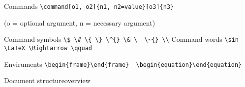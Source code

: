 \begin{frame}[fragile]{Commands}
    \lstinline[basicstyle=\tt\large]|\command[o1, o2]{n1, n2=value}[o3]{n3}|\par
    (o = optional argument, n = necessary argument)~\\[2ex]

\pause

    {\csk Command symbols}
    \verb|\$ \# \{ \} \^{} \& \_ \~{} \\|
    \vfil
    {\csk Command words}
    \verb|\sin \LaTeX \Rightarrow \qquad|
    
    {\csk Enviruments}
    \verb|\begin{frame}\end{frame}  \begin{equation}\end{equation}|
    
\end{frame}

\begin{frame}[fragile]{Document structure}{overview}
    
    
\end{frame}

